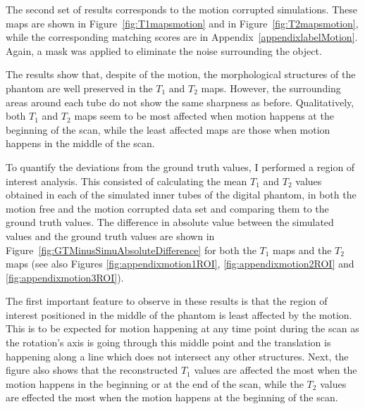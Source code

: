 The second set of results corresponds to the motion corrupted simulations.
These maps are shown in Figure~\ref{fig:T1mapsmotion} and in Figure~\ref{fig:T2mapsmotion}, while the corresponding matching scores are in Appendix~\ref{appendixlabelMotion}.
Again, a mask was applied to eliminate the noise surrounding the object.

\hfill

The results show that, despite of the motion, the morphological structures of the phantom are well preserved in the $T_1$ and $T_2$ maps. 
However, the surrounding areas around each tube do not show the same sharpness as before.
Qualitatively, both $T_1$ and $T_2$ maps seem to be most affected when motion happens at the beginning of the scan, while the least affected maps are those when motion happens in the middle of the scan.

\hfill

To quantify the deviations from the ground truth values, I performed a region of interest analysis.
This consisted of calculating the mean $T_1$ and $T_2$ values obtained in each of the simulated inner tubes of the digital phantom,
in both the motion free and the motion corrupted data set and comparing them to the ground truth values.
The difference in absolute value between the simulated values and the ground truth values are shown in Figure~\ref{fig:GTMinusSimuAbsoluteDifference} for both the $T_1$ maps and the $T_2$ maps (see also Figures \ref{fig:appendixmotion1ROI}, \ref{fig:appendixmotion2ROI} and \ref{fig:appendixmotion3ROI}).

\hfill

The first important feature to observe in these results is that the region of interest positioned in the middle of the phantom is least affected by the motion.
This is to be expected for motion happening at any time point during the scan as the rotation's axis is going through this middle point and the translation is happening along a line which does not intersect any other structures.
Next, the figure also shows that the reconstructed $T_1$ values are affected the most when the motion happens in the beginning or at the end of the scan, while the $T_2$ values are effected the most when the motion happens at the beginning of the scan.

\hfill

